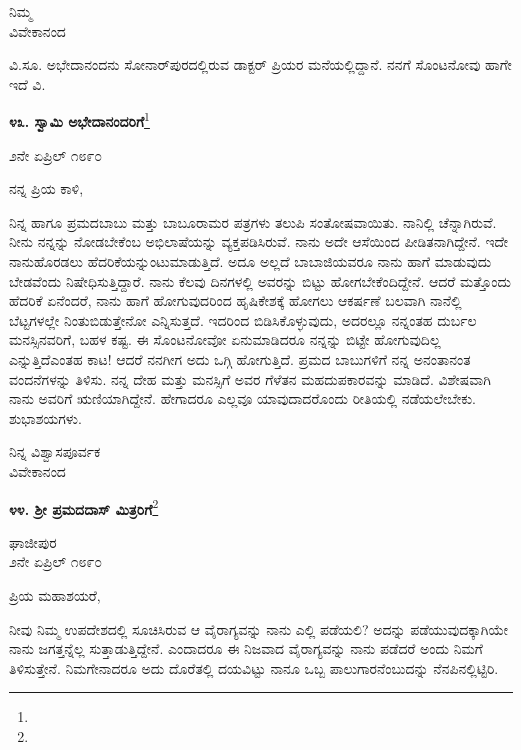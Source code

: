 {\flushright
ನಿಮ್ಮ\\ವಿವೇಕಾನಂದ\par}

ವಿ.ಸೂ.\enginline{-} ಅಭೇದಾನಂದನು ಸೋನಾರ್‌ಪುರದಲ್ಲಿರುವ ಡಾಕ್ಟರ್ ಪ್ರಿಯರ ಮನೆಯಲ್ಲಿದ್ದಾನೆ. ನನಗೆ ಸೊಂಟನೋವು ಹಾಗೇ ಇದೆ \enginline{-} ವಿ.

\begin{center}
\textbf{೪೩. ಸ್ವಾಮಿ ಅಭೇದಾನಂದರಿಗೆ}\footnote{}
\end{center}

\begin{flushright}
೨ನೇ ಏಪ್ರಿಲ್ ೧೮೯೦
\end{flushright}

\noindent
ನನ್ನ ಪ್ರಿಯ ಕಾಳಿ,

ನಿನ್ನ ಹಾಗೂ ಪ್ರಮದಬಾಬು ಮತ್ತು ಬಾಬೂರಾಮರ ಪತ್ರಗಳು ತಲುಪಿ ಸಂತೋಷವಾಯಿತು. ನಾನಿಲ್ಲಿ ಚೆನ್ನಾಗಿರುವೆ. ನೀನು ನನ್ನನ್ನು ನೋಡಬೇಕೆಂಬ ಅಭಿಲಾಷೆಯನ್ನು ವ್ಯಕ್ತಪಡಿಸಿರುವೆ. ನಾನು ಅದೇ ಆಸೆಯಿಂದ ಪೀಡಿತನಾಗಿದ್ದೇನೆ. ಇದೇ ನಾನುಹೊರಡಲು ಹೆದರಿಕೆಯನ್ನುಂಟುಮಾಡುತ್ತಿದೆ. ಅದೂ ಅಲ್ಲದೆ ಬಾಬಾಜಿಯವರೂ ನಾನು ಹಾಗೆ ಮಾಡುವುದು ಬೇಡವೆಂದು ನಿಷೇಧಿಸುತ್ತಿದ್ದಾರೆ. ನಾನು ಕೆಲವು ದಿನಗಳಲ್ಲಿ ಅವರನ್ನು ಬಿಟ್ಟು ಹೋಗಬೇಕೆಂದಿದ್ದೇನೆ. ಆದರೆ ಮತ್ತೊಂದು ಹೆದರಿಕೆ ಏನೆಂದರೆ, ನಾನು ಹಾಗೆ ಹೋಗುವುದರಿಂದ ಹೃಷಿಕೇಶಕ್ಕೆ ಹೋಗಲು ಆಕರ್ಷಣೆ ಬಲವಾಗಿ ನಾನೆಲ್ಲಿ ಬೆಟ್ಟಗಳಲ್ಲೇ ನಿಂತುಬಿಡುತ್ತೇನೋ ಎನ್ನಿಸುತ್ತದೆ. ಇದರಿಂದ ಬಿಡಿಸಿಕೊಳ್ಳುವುದು, ಅದರಲ್ಲೂ ನನ್ನಂತಹ ದುರ್ಬಲ ಮನಸ್ಸಿನವರಿಗೆ, ಬಹಳ ಕಷ್ಟ. ಈ ಸೊಂಟನೋವೋ ಏನುಮಾಡಿದರೂ ನನ್ನನ್ನು ಬಿಟ್ಟೇ ಹೋಗುವುದಿಲ್ಲ ಎನ್ನುತ್ತಿದೆ\enginline{-}ಎಂತಹ ಕಾಟ! ಆದರೆ ನನಗೀಗ ಅದು ಒಗ್ಗಿ ಹೋಗುತ್ತಿದೆ. ಪ್ರಮದ ಬಾಬುಗಳಿಗೆ ನನ್ನ ಅನಂತಾನಂತ ವಂದನೆಗಳನ್ನು ತಿಳಿಸು. ನನ್ನ ದೇಹ ಮತ್ತು ಮನಸ್ಸಿಗೆ ಅವರ ಗೆಳೆತನ ಮಹದುಪಕಾರವನ್ನು ಮಾಡಿದೆ. ವಿಶೇಷವಾಗಿ ನಾನು ಅವರಿಗೆ ಋಣಿಯಾಗಿದ್ದೇನೆ. ಹೇಗಾದರೂ ಎಲ್ಲವೂ ಯಾವುದಾದರೊಂದು ರೀತಿಯಲ್ಲಿ ನಡೆಯಲೇಬೇಕು. ಶುಭಾಶಯಗಳು.

\vspace{-0.3cm}

{\flushright
ನಿನ್ನ ವಿಶ್ವಾಸಪೂರ್ವಕ\\ವಿವೇಕಾನಂದ\par}

\begin{center}
\textbf{೪೪. ಶ‍್ರೀ ಪ್ರಮದದಾಸ್ ಮಿತ್ರರಿಗೆ}\footnote{}
\end{center}

\vspace{-0.65cm}

\begin{flushright}
ಘಾಜೀಪುರ\\೨ನೇ ಏಪ್ರಿಲ್ ೧೮೯೦
\end{flushright}

\noindent
ಪ್ರಿಯ ಮಹಾಶಯರೆ,

ನೀವು ನಿಮ್ಮ ಉಪದೇಶದಲ್ಲಿ ಸೂಚಿಸಿರುವ ಆ ವೈರಾಗ್ಯವನ್ನು ನಾನು ಎಲ್ಲಿ ಪಡೆಯಲಿ? ಅದನ್ನು ಪಡೆಯುವುದಕ್ಕಾಗಿಯೇ ನಾನು ಜಗತ್ತನ್ನೆಲ್ಲ ಸುತ್ತಾಡುತ್ತಿದ್ದೇನೆ. ಎಂದಾದರೂ ಈ ನಿಜವಾದ ವೈರಾಗ್ಯವನ್ನು ನಾನು ಪಡೆದರೆ ಅಂದು ನಿಮಗೆ ತಿಳಿಸುತ್ತೇನೆ. ನಿಮಗೇನಾದರೂ ಅದು ದೊರೆತಲ್ಲಿ ದಯವಿಟ್ಟು ನಾನೂ ಒಬ್ಬ ಪಾಲುಗಾರನೆಂಬುದನ್ನು ನೆನಪಿನಲ್ಲಿಟ್ಟಿರಿ.

